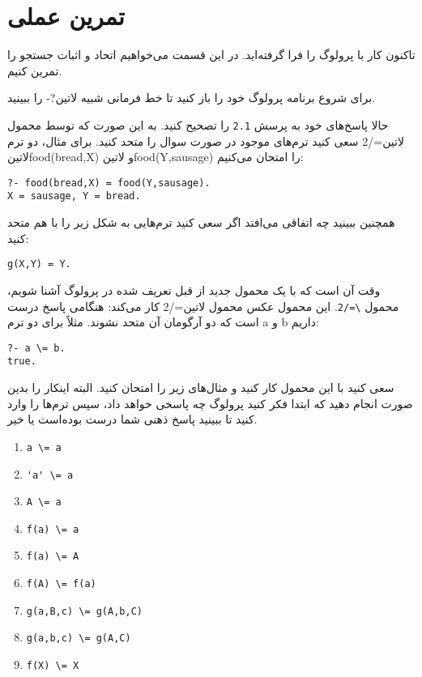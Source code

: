 \clearpage

\section{تمرین عملی}

تاکنون کار با پرولوگ را فرا گرفته‌اید. در این قسمت می‌خواهیم اتحاد و اثبات جستجو را تمرین کنیم.

برای شروع برنامه پرولوگ خود را باز کنید تا خط فرمانی شبیه ‌لاتین{?-} را ببینید.

حالا پاسخ‌های خود به پرسش \verb!2.1! را تصحیح کنید. به این صورت که توسط محمول ‌لاتین{=/2} سعی کنید ترم‌های موجود در صورت سوال را متحد کنید. برای مثال، دو ترم ‌لاتین{food(bread,X)} و ‌لاتین{food(Y,sausage)} را امتحان می‌کنیم:

\begin{latin}
\begin{lstlisting}
?- food(bread,X) = food(Y,sausage).
X = sausage, Y = bread.
\end{lstlisting}
\end{latin}

همچنین ببینید چه اتفاقی می‌افتد اگر سعی کنید ترم‌هایی به شکل زیر را با هم متحد کنید:

\begin{latin}
\begin{lstlisting}
g(X,Y) = Y.
\end{lstlisting}
\end{latin}

وقت آن است که با یک محمول جدید از قبل تعریف شده در پرولوگ آشنا شویم، محمول  \verb!\=/2!. این محمول عکس محمول ‌لاتین{=/2} کار می‌کند: هنگامی پاسخ درست است که دو آرگومان آن متحد نشوند. مثلاً برای دو ترم a و b داریم:

\begin{latin}
\begin{lstlisting}
?- a \= b.
true.
\end{lstlisting}
\end{latin}

سعی کنید با این محمول کار کنید و مثال‌های زیر را امتحان کنید. البته اینکار را بدین صورت انجام دهید که ابتدا فکر کنید پرولوگ چه پاسخی خواهد داد، سپس ترم‌ها را وارد کنید تا ببینید پاسخ ذهنی شما درست بوده‌است یا خیر.

\begin{latin}
\begin{enumerate}
\item \verb!a \= a!
\item \verb!'a' \= a!
\item \verb!A \= a!
\item \verb!f(a) \= a!
\item \verb!f(a) \= A!
\item \verb!f(A) \= f(a)!
\item \verb!g(a,B,c) \= g(A,b,C)!
\item \verb!g(a,b,c) \= g(A,C)!
\item \verb!f(X) \= X!
\end{enumerate}
\end{latin}

